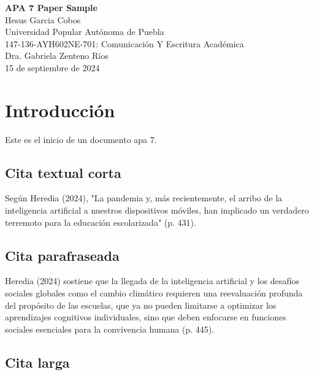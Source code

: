 \documentclass[man]{apa7}  %
\newcommand{\myTitle}{APA 7 Paper Sample}
\newcommand{\myAuthor}{Hesus Garcia Cobos}
\newcommand{\myAffiliation}{Universidad Popular Autónoma de Puebla}
\newcommand{\myCourse}{147-136-AYH602NE-701: Comunicación Y Escritura Académica}
\newcommand{\myProfessor}{Dra. Gabriela Zenteno Ríos}
\newcommand{\myDate}{15 de septiembre de 2024}
\begin{document}
\thispagestyle{fancyheader}  %

\vspace*{2in}
\begin{center}
    \textbf{\Large \myTitle} \\[24pt]
    \myAuthor \\[12pt]
    \myAffiliation \\[12pt]
    \myCourse \\[12pt]
    \myProfessor \\[12pt]
    \myDate  %
\end{center}

\newpage  %
\pagestyle{fancy}
\fancyhf{}
\fancyhead[R]{\thepage}  %

\doublespacing  %

\section{Introducción}

Este es el inicio de un documento apa 7.

\subsection{Cita textual corta}

Según Heredia (2024), "La pandemia y, más recientemente, el arribo de la inteligencia artificial a nuestros dispositivos móviles, han implicado un verdadero terremoto para la educación escolarizada" (p. 431).

\subsection{Cita parafraseada}

Heredia (2024) sostiene que la llegada de la inteligencia artificial y los desafíos sociales globales como el cambio climático requieren una reevaluación profunda del propósito de las escuelas, que ya no pueden limitarse a optimizar los aprendizajes cognitivos individuales, sino que deben enfocarse en funciones sociales esenciales para la convivencia humana (p. 445).

\subsection{Cita larga}
\end{document}
